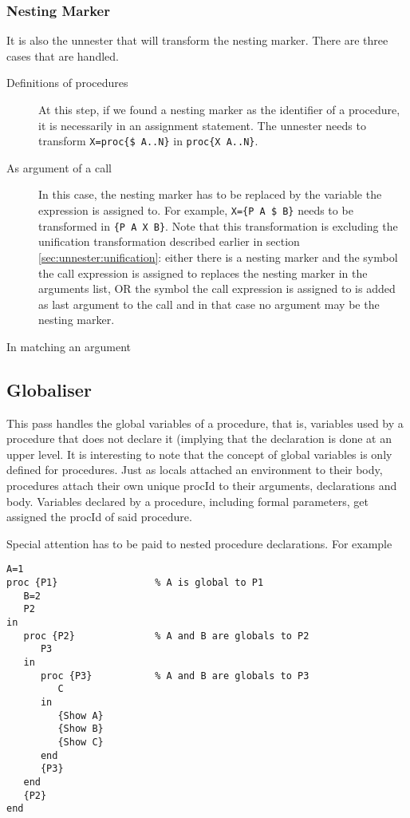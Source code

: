 \documentclass[a4paper]{memoir}
\begin{document}
\subsubsection{Nesting Marker}\label{sec:unnester:nestingmarker}
It is also the unnester that will transform the nesting marker. There are three cases that are handled.
\begin{description}
  \item[Definitions of procedures] At this step, if we found a nesting marker as the identifier of a procedure, it is necessarily in an assignment statement. The unnester needs to transform \lstinline!X=proc{$ A..N}! in \lstinline!proc{X A..N}!.
  \item[As argument of a call] In this case, the nesting marker has to be replaced by the variable the expression is assigned to. For example, \lstinline!X={P A $ B}! needs to be transformed in  \lstinline!{P A X B}!. Note that this transformation is excluding the unification transformation described earlier in section \ref{sec:unnester:unification}: either there is a nesting marker and the symbol the call expression is assigned to replaces the nesting marker in the arguments list, OR the symbol the call expression is assigned to is added as last argument to the call and in that case no argument may be the nesting marker.
  \item[In matching an argument] %
\end{description}

\subsection{Globaliser}            
This pass handles the global variables of a procedure, that is, variables used by a procedure that does not declare it (implying that the declaration is done at an upper level. It is interesting to note that the concept of global variables is only defined for procedures.
Just as locals attached an environment to their body, procedures attach their own unique procId to their arguments, declarations and body.
Variables declared by a procedure, including formal parameters, get assigned the procId of said procedure.

Special attention has to be paid to nested procedure declarations. For example
\begin{lstlisting}
A=1
proc {P1}                 % A is global to P1
   B=2
   P2
in
   proc {P2}              % A and B are globals to P2
      P3 
   in
      proc {P3}           % A and B are globals to P3
         C
      in
         {Show A}
         {Show B}
         {Show C}
      end
      {P3}
   end
   {P2}
end
\end{lstlisting}
\end{document}
